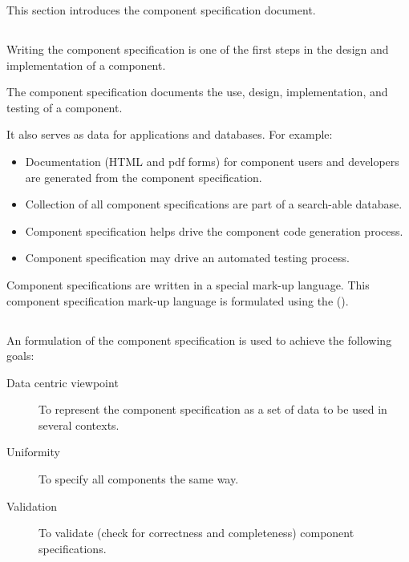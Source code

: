 \documentclass[11pt]{article}
\begin{document}
This section introduces the component specification document.

\subsection{\SUBSECwhySpec}
\label{\SUBSECwhySpec}

Writing the \xml{} component specification is one of the first steps in the
design and implementation of a component.

The \xml{} component specification documents the use, design,
implementation, and testing of a \sr{} component.  

It also serves as data for applications and databases.  For example:

\begin{itemize}
\item Documentation (HTML and pdf forms) for component users and
  developers are generated from the component specification.
  
\item Collection of all component specifications are part of a 
  search-able database.
  
\item Component specification helps drive the component code
  generation process.
  
\item Component specification may drive an automated testing process.
\end{itemize}

Component specifications are written in a special mark-up language.  This
component specification mark-up language is formulated using the 
(\xml).


\subsection{\SUBSECwhyXml}
\label{\SUBSECwhyXml}

An \xml{} formulation of the component specification is used to achieve
the following goals:

\begin{description}
\item[Data centric viewpoint] To represent the component specification as a set of data to be used in several contexts.

\item[Uniformity] To specify all components the same way.
  
\item[Validation] To validate (check for correctness and
  completeness) component specifications.
\end{description}
\end{document}
